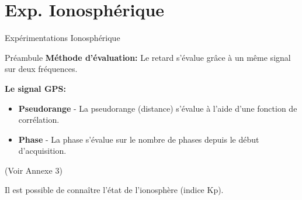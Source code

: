 \documentclass[xcolor=dvipsnames,envcountsect]{beamer}
\begin{document}
\section{Exp. Ionosphérique}
\begin{frame}
	\centering
	\begin{block}
		\scshape
		\begin{center}
			\Huge Expérimentations Ionosphérique
		\end{center}
	\end{block}
\end{frame}
\begin{frame}{Préambule}
        \textbf{Méthode d'évaluation:} 
		Le retard s'évalue grâce à un même signal sur deux fréquences.

        \textbf{Le signal GPS:} 
	    \begin{itemize}
            \item \textbf{Pseudorange} - La pseudorange (distance) s'évalue à l'aide d'une fonction de corrélation.
            \item \textbf{Phase} - La phase s'évalue sur le nombre de phases depuis le début d'acquisition.
        \end{itemize}
		\begin{flushright}
			\tiny{(Voir Annexe 3)}
		\end{flushright}
		Il est possible de connaître l'état de l'ionosphère (indice Kp).
\end{frame}
\end{document}
